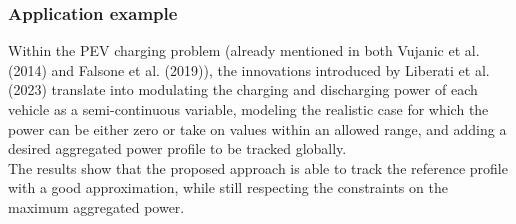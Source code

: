 \subsubsection{Application example}
Within the PEV charging problem (already mentioned in both Vujanic et al. (2014)\supercite{vujanic} and Falsone et al. (2019)\supercite{falsone}), the innovations introduced by Liberati et al. (2023)\supercite{liberati} translate into modulating the charging and discharging power of each vehicle as a semi-continuous variable, modeling the realistic case for which the power can be either zero or take on values within an allowed range, and adding a desired aggregated power profile to be tracked globally.\\
The results show that the proposed approach is able to track the reference profile with a good approximation, while still respecting the constraints on the maximum aggregated power. 